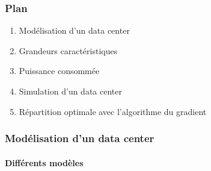 \documentclass[a4paper,11pt]{beamer}
\begin{document}
\begin{frame}
    \frametitle{Plan}
    \begin{enumerate}
        \item Modélisation d'un data center
        \item Grandeurs caractéristiques
        \item Puissance consommée
        \item Simulation d'un data center
        \item Répartition optimale avec l'algorithme du gradient
    \end{enumerate}
\end{frame}

\begin{frame}
    \frametitle{Modélisation d'un data center}
    \framesubtitle{Différents modèles}


\end{frame}
\end{document}
